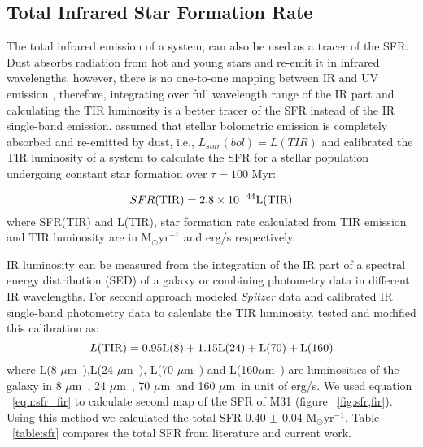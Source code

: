 \documentclass[useAMS,usenatbib]{mn2e}
\newcommand \um    {$\mu$m\ }
\newcommand \Spitzer {{\it Spitzer }}
\begin{document}
\subsection{Total Infrared Star Formation Rate}
\label{sec:sfr_fir}
The total infrared emission of a system, can also be used as a tracer of the SFR. Dust absorbs radiation from hot and young stars and re-emit it in infrared wavelengths, however, there is no one-to-one mapping between IR and UV emission \citep{Calzetti13}, therefore, integrating over full wavelength range of the IR part and calculating the TIR luminosity is a better tracer of the SFR instead of the IR single-band emission. \cite{Calzetti07} assumed that stellar bolometric emission is completely absorbed and re-emitted by dust, i.e., $L_{star}(bol) = L(TIR)$ and calibrated the TIR luminosity of a system to calculate the SFR for a stellar population undergoing constant star formation over $\tau = 100$ Myr:

\begin{equation}
\label{equ:sfr_fir}
SFR(\rm TIR) = 2.8 \times10^{-44}L(\rm TIR)
\end{equation}
where SFR(TIR) and L(TIR), star formation rate calculated from TIR emission and TIR luminosity are in M$_{\odot}$yr$^{-1}$ and erg/s respectively.


IR luminosity can be measured from the integration of the IR part of a spectral energy distribution (SED) of a galaxy or combining photometry data in different IR wavelengths. For second approach \cite{Draine07} modeled \Spitzer data and calibrated IR single-band photometry data to calculate the TIR luminosity. \cite{Boquien10} tested and modified this calibration as:
\begin{equation}
 \label{equ: TIR}
L(\rm TIR) = 0.95L(8) + 1.15L(24) + L(70) + L(160)
\end{equation}
where L(8 \um),L(24 \um), L(70 \um) and L(160\um) are luminosities of the galaxy in 8 \um, 24 \um, 70 \um and 160 \um in unit of erg/s. We used equation ~\ref{equ:sfr_fir} to calculate second map of the SFR of M31 (figure ~\ref{fig:sfr,fir}). Using this method we calculated the total SFR 0.40 $\pm$ 0.04 M$_{\odot}$yr$^{-1}$. Table ~\ref{table:sfr} compares the total SFR from literature and current work.
\end{document}
